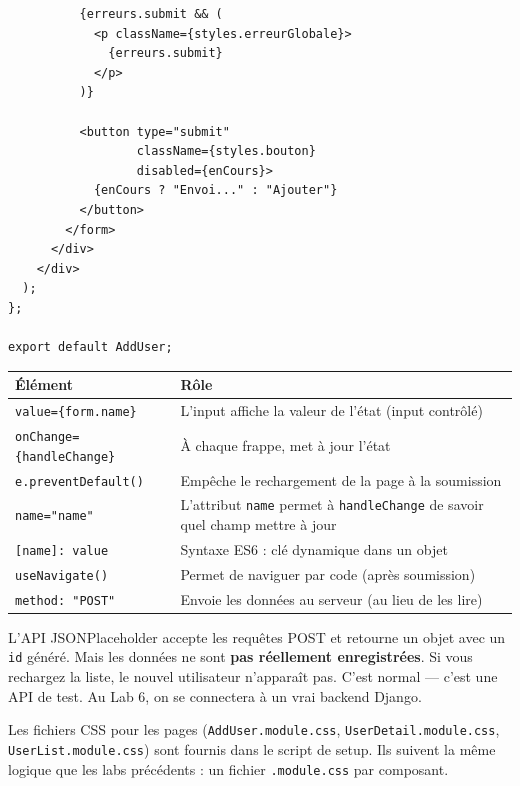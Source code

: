 \documentclass[11pt,a4paper]{article}
\begin{document}
\begin{lstlisting}
          {erreurs.submit && (
            <p className={styles.erreurGlobale}>
              {erreurs.submit}
            </p>
          )}

          <button type="submit"
                  className={styles.bouton}
                  disabled={enCours}>
            {enCours ? "Envoi..." : "Ajouter"}
          </button>
        </form>
      </div>
    </div>
  );
};

export default AddUser;
\end{lstlisting}

\begin{retenirbox}
\begin{center}
\begin{tabular}{lp{8cm}}
\toprule
\textbf{Élément} & \textbf{Rôle} \\
\midrule
\texttt{value=\{form.name\}} & L'input affiche la valeur de l'état (input contrôlé) \\
\texttt{onChange=\{handleChange\}} & À chaque frappe, met à jour l'état \\
\texttt{e.preventDefault()} & Empêche le rechargement de la page à la soumission \\
\texttt{name="name"} & L'attribut \texttt{name} permet à \texttt{handleChange} de savoir quel champ mettre à jour \\
\texttt{[name]: value} & Syntaxe ES6 : clé dynamique dans un objet \\
\texttt{useNavigate()} & Permet de naviguer par code (après soumission) \\
\texttt{method: "POST"} & Envoie les données au serveur (au lieu de les lire) \\
\bottomrule
\end{tabular}
\end{center}
\end{retenirbox}

\begin{attentionbox}
L'API JSONPlaceholder accepte les requêtes POST et retourne un objet avec un \texttt{id} généré. Mais les données ne sont \textbf{pas réellement enregistrées}. Si vous rechargez la liste, le nouvel utilisateur n'apparaît pas. C'est normal --- c'est une API de test. Au Lab 6, on se connectera à un vrai backend Django.
\end{attentionbox}

Les fichiers CSS pour les pages (\texttt{AddUser.module.css}, \texttt{UserDetail.module.css}, \texttt{UserList.module.css}) sont fournis dans le script de setup. Ils suivent la même logique que les labs précédents : un fichier \texttt{.module.css} par composant.
\end{document}
